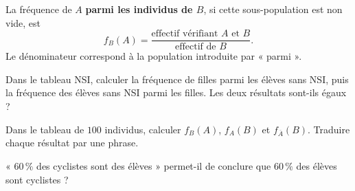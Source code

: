 \begin{keypoint}[Définition]
La fréquence de $A$ \textbf{parmi les individus de $B$}, si cette sous-population est non vide, est
\[f_B(A)=\frac{\text{effectif vérifiant }A\text{ et }B}{\text{effectif de }B}.\]
Le dénominateur correspond à la population introduite par « parmi ».
\end{keypoint}
\begin{example}Dans le tableau NSI, calculer la fréquence de filles parmi les élèves sans NSI, puis la fréquence des élèves sans NSI parmi les filles. Les deux résultats sont-ils égaux ?\end{example}
\begin{example}Dans le tableau de $100$ individus, calculer $f_B(A)$, $f_A(B)$ et $f_{\overline A}(B)$. Traduire chaque résultat par une phrase.\end{example}
\begin{example}« $60\,\%$ des cyclistes sont des élèves » permet-il de conclure que $60\,\%$ des élèves sont cyclistes ?\end{example}

